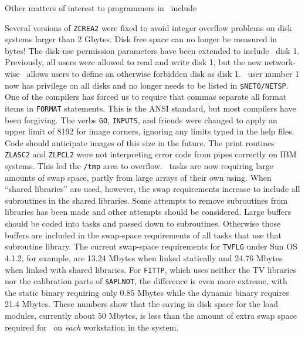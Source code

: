 Other matters of interest to programmers in \RELEASENAME\ include
\vspace{-10pt}
\begin{description}
 Several versions of {\tt ZCREA2} were fixed
   to avoid integer overflow problems on disk systems larger than 2
   Gbytes.  Disk free space can no longer be measured in bytes!
 The disk-use permission parameters have
   been extended to include \AIPS\ disk 1.  Previously, all users were
   allowed to read and write disk 1, but the new network-wise \AIPS\
   allows users to define an otherwise forbidden disk as disk 1.
   \AIPS\ user number 1 now has privilege on all disks and no longer
   needs to be listed in \hbox{{\tt \$NET0/NETSP}}.
 One of the compilers has forced us to require
   that commas separate all format items in {\tt FORMAT} statements.
   This is the ANSI standard, but most compilers have been forgiving.
\myitem{{\bf image size}} The verbs {\tt GO}, {\tt INPUTS}, and
   friends were changed to apply an upper limit of 8192 for image
   corners, ignoring any limits typed in the help files.  Code should
   anticipate images of this size in the future.
 The print routines {\tt ZLASC2} and {\tt ZLPCL2}
   were not interpreting error code from pipes correctly on IBM
   systems.  This led the {\tt /tmp} area to overflow.
 \AIPS\ tasks are now requiring large amounts
   of swap space, partly from large arrays of their own using.  When
   ``shared libraries'' are used, however, the swap requirements
   increase to include all subroutines in the shared libraries.  Some
   attempts to remove subroutines from libraries has been made and
   other attempts should be considered.  Large buffers should be coded
   into tasks and passed down to subroutines.  Otherwise those buffers
   are included in the swap-space requirements of all tasks that use
   that subroutine library.  The current swap-space requirements for
   {\tt TVFLG} under Sun OS 4.1.2, for example, are 13.24 Mbytes when
   linked statically and 24.76 Mbytes when linked with shared
   libraries.  For {\tt FITTP}, which uses neither the TV libraries
   nor the calibration parts of {\tt \$APLNOT}, the difference is even
   more extreme, with the static binary requiring only 0.85 Mbytes
   while the dynamic binary requires 21.4 Mbytes.  These numbers show
   that the saving in disk space for the load modules, currently about
   50 Mbytes, is less than the amount of extra swap space required for
   \AIPS\ on {\it each} workstation in the system.
\end{description}

